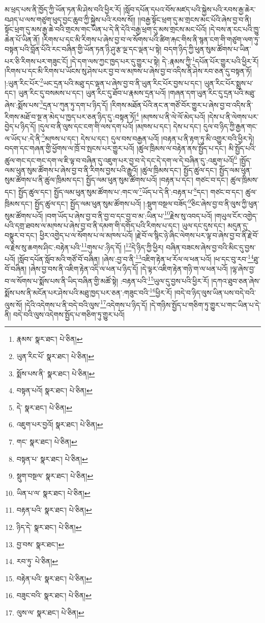 མ་ཕྲད་པས་ནི་ཁྱོད་ཀྱི་ཡོན་ཏན་མི་ཤེས་བའི་ཕྱིར་རོ། །སློབ་དཔོན་དཔའ་བོས་མཛད་པའི་སྐྱེས་པའི་རབས་རྒྱ་ཆེར་བཤད་པ་ལས་གཙུག་ཕུད་བྱང་ཆུབ་ཀྱི་སྐྱེས་པའི་རབས་སོ།། །།བརྒྱ་སྟོང་ཕྲག་དུ་མ་གྲངས་མང་པོའི་ཞེས་བྱ་བ་ནི། སྟོང་ཕྲག་དུ་མས་རྒྱ་ཆེ་བའི་གྲངས་གང་ཡིན་པ་དེ་ནི་དེའི་བརྒྱ་ཕྲག་དུ་མས་གྲངས་མང་པོའོ། །དེ་བས་ན་ངང་པའི་ཁྱུ་ཆེན་པོ་ཡིན་ནོ། །རིགས་པ་དང་མི་རིགས་པ་ཞེས་བྱ་བ་ལ་སོགས་པའི་ཚིག་རྐང་གིས་ནི་སྙན་ངག་གི་གཙུག་ལག་ཏུ་བསྟན་པའི་བློན་པོའི་རང་བཞིན་གྱི་ཡོན་ཏན་ཉི་ཤུ་རྩ་ལྔ་དང་ལྡན་པ་སྟེ། བདག་ཉིད་ཀྱི་ཕུན་སུམ་ཚོགས་པ་ཡིན་པར་ཅི་རིགས་པར་གཟུང་ངོ། །དེ་དག་ལས་ཀྱང་ཁྱད་པར་དུ་གྱུར་པ་སྟེ། དེ་:རྣམས་ཀྱི་\footnote{རྣམས་  སྣར་ཐང་།  པེ་ཅིན། }དཔོན་པོར་གྱུར་པའི་ཕྱིར་རོ། །རིགས་པ་དང་མི་རིགས་པ་ཡོངས་སུ་ཤེས་པར་བྱ་བ་ལ་མཁས་པ་ཞེས་བྱ་བ་འདིས་ནི་ཤེས་རབ་ཅན་དུ་བསྟན་ཏོ། །:ཡུན་རིང་པོར་\footnote{ཡུན་རིང་པོ་  སྣར་ཐང་།  པེ་ཅིན། }ཡང་དྲན་པའི་མཐུ་དང་ལྡན་པ་ཞེས་བྱ་བ་ནི་ཡུན་རིང་པོར་བྱས་པ་དང་། ཡུན་རིང་པོར་སྨྲས་པ་དང་། ཡུན་རིང་དུ་བསམས་པ་དང་། ཡུན་རིང་དུ་ཐོབ་པ་རྣམས་དྲན་པའོ། །གཞན་དག་ཡུན་རིང་དུ་དྲན་པའི་མཐུ་ཞེས་:སྨོས་པས་\footnote{སྨོས་པས་ནི་  སྣར་ཐང་།  པེ་ཅིན། }དྲན་པ་ཀུན་ཏུ་དག་པ་ཉིད་དོ། །རིགས་མཐོན་པོའི་ནང་ན་གཙོ་བོར་གྱུར་པ་ཞེས་བྱ་བ་འདིས་ནི་རིགས་མཐོ་བ་སྔ་ན་མེད་པ་ཁྱད་པར་ཅན་ཉིད་དུ་:བསྟན་ཏོ།\footnote{བསྟན་པའོ།  སྣར་ཐང་།  པེ་ཅིན། } །མཁས་པ་ནི་ལེ་ལོ་མེད་པའོ། །དེས་པ་ནི་ལེགས་པར་བྱེད་པ་ཉིད་དོ། །དུལ་བ་ནི་ལུས་དང་ངག་གི་ལས་དག་པའོ། །མཁས་པ་དང་། དེས་པ་དང་། དུལ་བ་ཉིད་ཀྱི་རྒྱན་གང་ལ་ཡོད་པ་:དེ་ནི་\footnote{དེ་  སྣར་ཐང་།  པེ་ཅིན། }མཁས་པ་དང་། དེས་པ་དང་། དུལ་བས་བརྒྱན་པའོ། །བརྟན་པ་ནི་རྟག་ཏུ་མི་འགྱུར་བའི་ཕྱིར་ཏེ། བདག་དང་གཞན་གྱི་ཕྱོགས་ལ་ཁྲོ་བ་སྤངས་པར་གྱུར་པའོ། །ཚུལ་ཁྲིམས་ལ་བརྟེན་ནས་སྤྱོད་པ་དང་། མི་སྤྱོད་པའི་ཚུལ་གང་དང་གང་དག་ལ་ཇི་ལྟ་བ་བཞིན་དུ་འཇུག་པར་བྱ་བ་དེ་དང་དེ་དག་ལ་དེ་བཞིན་དུ་:འཇུག་པའོ།\footnote{འཇུག་པར་བྱའོ།  སྣར་ཐང་།  པེ་ཅིན། } །སྤྱོད་ལམ་ཕུན་སུམ་ཚོགས་པ་ཞེས་བྱ་བ་ནི་རིགས་བྱས་པའི་རྒྱུའོ། །ཚུལ་ཁྲིམས་དང་། སྤྱོད་ཚུལ་དང་། སྤྱོད་ལམ་ཕུན་སུམ་ཚོགས་པ་ནི་ཚུལ་ཁྲིམས་དང་། སྤྱོད་ལམ་ཕུན་སུམ་ཚོགས་པའོ། །བརྟན་པ་དང་། གཙང་བ་དང་། ཚུལ་ཁྲིམས་དང་། སྤྱོད་ཚུལ་དང་། སྤྱོད་ལམ་ཕུན་སུམ་ཚོགས་པ་:གང་ལ་\footnote{གང་  སྣར་ཐང་།  པེ་ཅིན། }ཡོད་པ་དེ་ནི་:བརྟན་པ་\footnote{བསྟན་པ་  སྣར་ཐང་།  པེ་ཅིན། }དང་། གཙང་བ་དང་། ཚུལ་ཁྲིམས་དང་། སྤྱོད་ཚུལ་དང་། སྤྱོད་ལམ་ཕུན་སུམ་ཚོགས་པའོ། །:སྡུག་བསྔལ་བཟོད་\footnote{སྡུག་བསྔལ་  སྣར་ཐང་།  པེ་ཅིན། }ཅིང་ཞེས་བྱ་བ་ནི་ལུས་ཀྱི་ཕུན་སུམ་ཚོགས་པའོ། །བག་ཡོད་པ་ཞེས་བྱ་བ་ནི་བྱ་བ་དང་བྱ་བ་མ་:ཡིན་པ་\footnote{ཡིན་པ་ལ་  སྣར་ཐང་།  པེ་ཅིན། }རྗེས་སུ་འབད་པའོ། །གཡུལ་ངོར་འགྱེད་པའི་དགྲ་ཐབས་ལ་མཁས་པ་ཞེས་བྱ་བ་ནི་དམག་གི་དགོད་པའི་རིགས་པ་དང་། ཡུལ་དང་དུས་དང་། མདུན་དུ་བསྣུར་བ་དང་། ཕྱིར་འགྱེད་པ་ལ་སོགས་པ་ལ་མཁས་པའོ། །རྗེ་བོ་ལ་སྙིང་ཉེ་ཞིང་ལེགས་པར་ལྟ་བ་ཞེས་བྱ་བ་ནི་རྗེ་བོ་ལ་རྗེས་སུ་ཆགས་ཤིང་:བརྟེན་པའི་\footnote{བརྟན་པའི་  སྣར་ཐང་།  པེ་ཅིན། }གུས་པ་:ཉིད་དོ། །\footnote{ཉིད་དེ་  སྣར་ཐང་།  པེ་ཅིན། }དེ་ཉིད་ཀྱི་ཕྱིར། བཞིན་བཟངས་ཞེས་བྱ་བའི་མིང་དུ་བྱས་པའོ། །སློབ་དཔོན་སློབ་མའི་གཙོ་བོ་བཞིན། །ཞེས་:བྱ་བ་ནི་\footnote{བྱ་བས་  སྣར་ཐང་། }འཇིག་རྟེན་ཕ་རོལ་ལ་ཕན་པའོ། །ཕ་དང་བུ་རབ་\footnote{རབ་ཏུ་  པེ་ཅིན། }ཐུ་བོ་བཞིན། །ཞེས་བྱ་བས་ནི་འཇིག་རྟེན་འདི་ལ་ཕན་པ་ཉིད་དོ། །དེ་ལྟར་འཇིག་རྟེན་གཉི་ག་ལ་ཕན་པའོ། །ལྷ་ཞེས་བྱ་བ་ལ་སོགས་པ་སྨོས་པས་ནི་ཡིད་བཞིན་གྱི་མཚོ་སྟེ། :བརྟན་པའི་\footnote{བརྟེན་པའི་  སྣར་ཐང་།  པེ་ཅིན། }ཡུལ་དུ་བྱས་པའི་ཕྱིར་རོ། །དཀའ་ཐུབ་ཅན་ཞེས་སྨོས་པས་ནི་མངོན་པར་ཤེས་པའི་མཐུ་ཁྱད་པར་ཅན་:གཟུང་བའི་\footnote{བཟུང་བའི་  སྣར་ཐང་།  པེ་ཅིན། }ཕྱིར་རོ། །བདེ་བ་ཉིད་ལུས་ཡིན་པས་བདེ་བའི་ལུས་སོ། །དེའི་འདེགས་པ་ནི་བདེ་བའི་ལུས་\footnote{ལུས་ལ་  སྣར་ཐང་།  པེ་ཅིན། }འདེགས་པ་ཉིད་དོ། །དེ་གཉིས་སྤྱོད་པ་གཅིག་ཏུ་གྱུར་པ་གང་ཡིན་པ་དེ་ནི། བདེ་བའི་ལུས་འདེགས་སྤྱོད་པ་གཅིག་ཏུ་གྱུར་པའོ། 